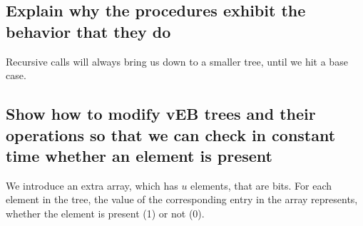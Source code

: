 \subsection*{Explain why the procedures exhibit the behavior that they do}

Recursive calls will always bring us down to a smaller tree, until we hit a base case.

\subsection*{Show how to modify vEB trees and their operations so that we can check in constant time whether an element is present}

We introduce an extra array, which has $u$ elements, that are bits. For each element in the tree, the value of the corresponding entry in the array represents, whether the element is present (1) or not (0).